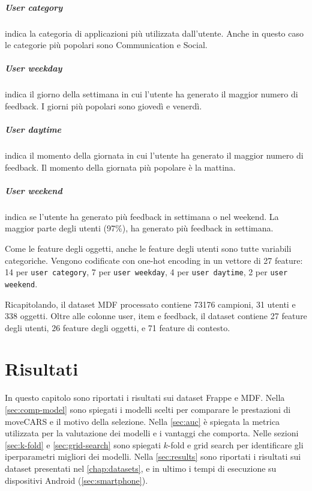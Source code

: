 \documentclass[12pt,italian]{report}
\begin{document}
\paragraph{User category} indica la categoria di applicazioni più utilizzata dall'utente. Anche in questo caso le categorie più popolari sono Communication e Social.

\paragraph{User weekday} indica il giorno della settimana in cui l'utente ha generato il maggior numero di feedback. I giorni più popolari sono giovedì e venerdì.

\paragraph{User daytime} indica il momento della giornata in cui l'utente ha generato il maggior numero di feedback. Il momento della giornata più popolare è la mattina.

\paragraph{User weekend} indica se l'utente ha generato più feedback in settimana o nel weekend. La maggior parte degli utenti (97\%), ha generato più feedback in settimana.

\bigskip \noindent
Come le feature degli oggetti, anche le feature degli utenti sono tutte variabili categoriche. Vengono codificate con one-hot encoding in un vettore di 27 feature: 14 per \texttt{user category}, 7 per \texttt{user weekday}, 4 per \texttt{user daytime}, 2 per \texttt{user weekend}.

Ricapitolando, il dataset MDF processato contiene 73176 campioni, 31 utenti e 338 oggetti. Oltre alle colonne user, item e feedback, il dataset contiene  27 feature degli utenti, 26 feature degli oggetti, e 71 feature di contesto.


% 
% 

\chapter{Risultati} \label{chap:risultati}
In questo capitolo sono riportati i risultati sui dataset Frappe e MDF. Nella \autoref{sec:comp-model} sono spiegati i modelli scelti per comparare le prestazioni di moveCARS e il motivo della selezione. Nella \autoref{sec:auc} è spiegata la metrica utilizzata per la valutazione dei modelli e i vantaggi che comporta. Nelle sezioni \ref{sec:k-fold} e \ref{sec:grid-search} sono spiegati $k$-fold e grid search per identificare gli iperparametri migliori dei modelli. Nella \autoref{sec:results} sono riportati i risultati sui dataset presentati nel \autoref{chap:datasets}, e in ultimo i tempi di esecuzione su dispositivi Android (\autoref{sec:smartphone}).
\end{document}
